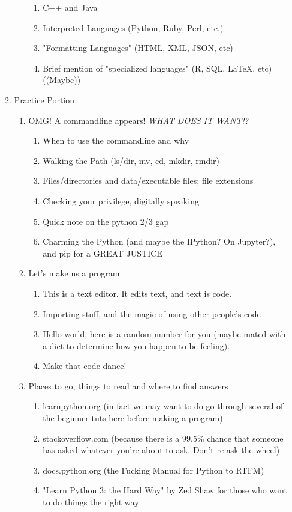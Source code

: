 \documentclass[11pt]{article}
\begin{document}
\begin{enumerate}[I]
\begin{enumerate}
\begin{enumerate}
\begin{enumerate}
				\item C++ and Java
				\item Interpreted Languages (Python, Ruby, Perl, etc.)
				\item "Formatting Languages" (HTML, XML, JSON, etc)
				\item Brief mention of "specialized languages" (R, SQL, LaTeX, etc) ((Maybe)) 
			\end{enumerate}
		\end{enumerate}
		\item Practice Portion
		\begin{enumerate}
			\item OMG! A commandline appears! \emph{WHAT DOES IT WANT!?}
			\begin{enumerate}
				\item When to use the commandline and why
				\item Walking the Path (ls/dir, mv, cd, mkdir, rmdir)
				\item Files/directories and data/executable files; file extensions
				\item Checking your privilege, digitally speaking
				\item Quick note on the python 2/3 gap
				\item Charming the Python (and maybe the IPython? On Jupyter?), and pip for a GREAT JUSTICE 
			\end{enumerate}
			\item Let's make us a program
			\begin{enumerate}
				\item This is a text editor. It edits text, and text is code.
				\item Importing stuff, and the magic of using other people's code
				\item Hello world, here is a random number for you (maybe mated with a dict to determine how you happen to be feeling).
				\item Make that code dance!
			\end{enumerate}
			\item Places to go, things to read and where to find answers
			\begin{enumerate}
				\item learnpython.org (in fact we may want to do go through several of the beginner tuts here before making a program)
				\item stackoverflow.com (because there is a 99.5\% chance that someone has asked whatever you're about to ask. Don't re-ask the wheel)
				\item docs.python.org (the Fucking Manual for Python to RTFM)
				\item "Learn Python 3: the Hard Way" by Zed Shaw for those who want to do things the right way 
			\end{enumerate}
		\end{enumerate}
	\end{enumerate}
\end{enumerate}    
\end{document}
